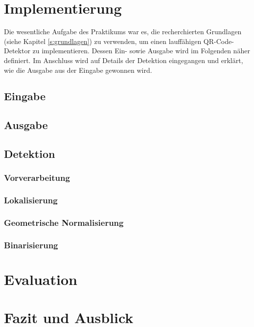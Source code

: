 \documentclass[a4paper, oneside, 12pt]{article}
\begin{document}
\newpage
\section{Implementierung}
\label{s:implementierung}
Die wesentliche Aufgabe des Praktikums war es, die recherchierten Grundlagen (siehe Kapitel \ref{s:grundlagen}) zu verwenden, um einen lauffähigen QR-Code-Detektor zu implementieren. Dessen Ein- sowie Ausgabe wird im Folgenden näher definiert.
Im Anschluss wird auf Details der Detektion eingegangen und erklärt, wie die Ausgabe aus der Eingabe gewonnen wird.

\subsection{Eingabe}

\subsection{Ausgabe}

\subsection{Detektion}

\subsubsection{Vorverarbeitung}

\subsubsection{Lokalisierung}

\subsubsection{Geometrische Normalisierung}

\subsubsection{Binarisierung}

\section{Evaluation}

\section{Fazit und Ausblick}
	
\end{document}
